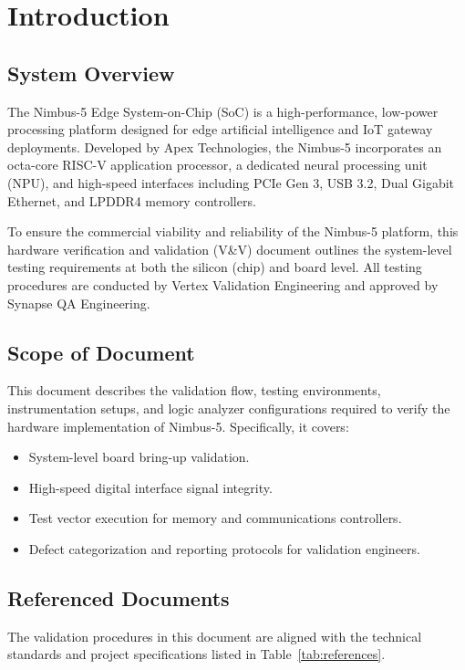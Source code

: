 \section{Introduction}

\subsection{System Overview}
The Nimbus-5 Edge System-on-Chip (SoC) is a high-performance, low-power processing platform designed for edge artificial intelligence and IoT gateway deployments. Developed by Apex Technologies, the Nimbus-5 incorporates an octa-core RISC-V application processor, a dedicated neural processing unit (NPU), and high-speed interfaces including PCIe Gen 3, USB 3.2, Dual Gigabit Ethernet, and LPDDR4 memory controllers.

To ensure the commercial viability and reliability of the Nimbus-5 platform, this hardware verification and validation (V\&V) document outlines the system-level testing requirements at both the silicon (chip) and board level. All testing procedures are conducted by Vertex Validation Engineering and approved by Synapse QA Engineering.

\subsection{Scope of Document}
This document describes the validation flow, testing environments, instrumentation setups, and logic analyzer configurations required to verify the hardware implementation of Nimbus-5. Specifically, it covers:
\begin{itemize}
    \item System-level board bring-up validation.
    \item High-speed digital interface signal integrity.
    \item Test vector execution for memory and communications controllers.
    \item Defect categorization and reporting protocols for validation engineers.
\end{itemize}

\subsection{Referenced Documents}
The validation procedures in this document are aligned with the technical standards and project specifications listed in Table~\ref{tab:references}.

